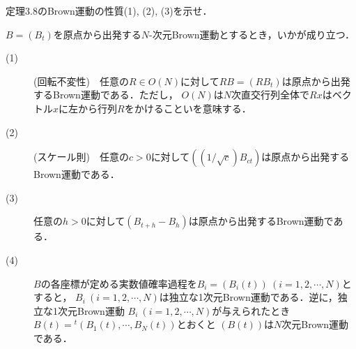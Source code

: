 定理3.8のBrown運動の性質(1), (2), (3)を示せ．
\begin{thm}[定理3.8]
$B = (B_t)$を原点から出発する$N$-次元Brown運動とするとき，いかが成り立つ．
\begin{description}
	\item[(1)](回転不変性)　任意の$R \in O(N)$に対して$RB = (RB_t)$は原点から出発するBrown運動である．ただし，
		$O(N)$は$N$次直交行列全体で$Rx$はベクトル$x$に左から行列$R$をかけることいを意味する．
	\item[(2)](スケール則)　任意の$c > 0$に対して$((1/\sqrt{c})B_{ct})$は原点から出発するBrown運動である．
	\item[(3)] 任意の$h > 0$に対して$(B_{t+h} - B_h)$は原点から出発するBrown運動である．
	\item[(4)] $B$の各座標が定める実数値確率過程を$B_i = (B_i(t))\ (i = 1,2,\cdots,N)$とすると，
		$B_i\ (i=1,2,\cdots,N)$は独立な1次元Brown運動である．逆に，独立な1次元Brown運動
		$B_i\ (i=1,2,\cdots,N)$が与えられたとき$B(t) = {}^t(B_1(t),\cdots,B_N(t))$とおくと
		$(B(t))$は$N$次元Brown運動である．
\end{description}
\end{thm}

